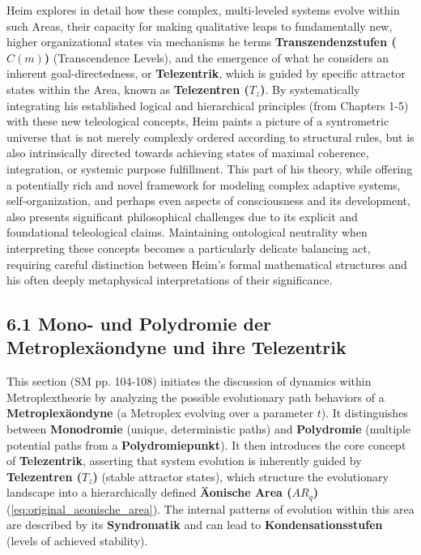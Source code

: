 \documentclass[12pt]{article}
\newcommand{\telezentrum}{T_z}
\newcommand{\aeonischearea}{AR_q}
\newcommand{\transzendenzstufe}[1]{C(#1)}
\begin{document}
Heim explores in detail how these complex, multi-leveled systems evolve within such Areas, their capacity for making qualitative leaps to fundamentally new, higher organizational states via mechanisms he terms \textbf{Transzendenzstufen (\(\transzendenzstufe{m}\))} (Transcendence Levels), and the emergence of what he considers an inherent goal-directedness, or \textbf{Telezentrik}, which is guided by specific attractor states within the Area, known as \textbf{Telezentren (\(\telezentrum\))}. By systematically integrating his established logical and hierarchical principles (from Chapters 1-5) with these new teleological concepts, Heim paints a picture of a syntrometric universe that is not merely complexly ordered according to structural rules, but is also intrinsically directed towards achieving states of maximal coherence, integration, or systemic purpose fulfillment. This part of his theory, while offering a potentially rich and novel framework for modeling complex adaptive systems, self-organization, and perhaps even aspects of consciousness and its development, also presents significant philosophical challenges due to its explicit and foundational teleological claims. Maintaining ontological neutrality when interpreting these concepts becomes a particularly delicate balancing act, requiring careful distinction between Heim's formal mathematical structures and his often deeply metaphysical interpretations of their significance.

\subsection{6.1 Mono- und Polydromie der Metroplexäondyne und ihre Telezentrik}
\label{sec:polydromie_telezentrik}

This section (SM pp. 104-108) initiates the discussion of dynamics within Metroplextheorie by analyzing the possible evolutionary path behaviors of a \textbf{Metroplexäondyne} (a Metroplex evolving over a parameter \(t\)). It distinguishes between \textbf{Monodromie} (unique, deterministic paths) and \textbf{Polydromie} (multiple potential paths from a \textbf{Polydromiepunkt}). It then introduces the core concept of \textbf{Telezentrik}, asserting that system evolution is inherently guided by \textbf{Telezentren (\(\telezentrum\))} (stable attractor states), which structure the evolutionary landscape into a hierarchically defined \textbf{\"{A}onische Area (\(\aeonischearea\))} (\eqref{eq:original_aeonische_area}). The internal patterns of evolution within this area are described by its \textbf{Syndromatik} and can lead to \textbf{Kondensationsstufen} (levels of achieved stability).
\end{document}
